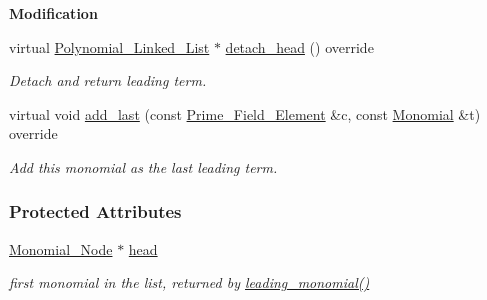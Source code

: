 \begin{Indent}\textbf{ Modification}\par
\begin{DoxyCompactItemize}
\item 
\mbox{\label{group__polygroup_a919a99403d3e5117919b3086844cb0e8}} 
virtual \hyperlink{group__polygroup_class_polynomial___linked___list}{Polynomial\+\_\+\+Linked\+\_\+\+List} $\ast$ \hyperlink{group__polygroup_a919a99403d3e5117919b3086844cb0e8}{detach\+\_\+head} () override
\begin{DoxyCompactList}\small\item\em Detach and return leading term. \end{DoxyCompactList}\item 
\mbox{\label{group__polygroup_a03ec271b09917f4dbabfe695fffad0ea}} 
virtual void \hyperlink{group__polygroup_a03ec271b09917f4dbabfe695fffad0ea}{add\+\_\+last} (const \hyperlink{group___fields_group_class_prime___field___element}{Prime\+\_\+\+Field\+\_\+\+Element} \&c, const \hyperlink{group__polygroup_class_monomial}{Monomial} \&t) override
\begin{DoxyCompactList}\small\item\em Add this monomial as the last leading term. \end{DoxyCompactList}\end{DoxyCompactItemize}
\end{Indent}
\subsubsection*{Protected Attributes}
\begin{DoxyCompactItemize}
\item 
\mbox{\label{group__polygroup_a55c2905ab5c77fb51ff1c282ec3ce9e5}} 
\hyperlink{group__polygroup_class_monomial___node}{Monomial\+\_\+\+Node} $\ast$ \hyperlink{group__polygroup_a55c2905ab5c77fb51ff1c282ec3ce9e5}{head}
\begin{DoxyCompactList}\small\item\em first monomial in the list, returned by \hyperlink{group__polygroup_aa2e4fe2b54a3da9074d3708f2a4729b7}{leading\+\_\+monomial()} \end{DoxyCompactList}\end{DoxyCompactItemize}
